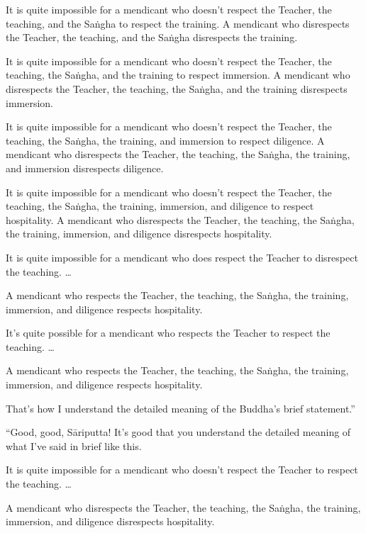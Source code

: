 \documentclass[12pt,openany]{book}%
\begin{document}
It is quite impossible for a mendicant who doesn’t respect the Teacher, the teaching, and the \textsanskrit{Saṅgha} to respect the training. A mendicant who disrespects the Teacher, the teaching, and the \textsanskrit{Saṅgha} disrespects the training. 

It is quite impossible for a mendicant who doesn’t respect the Teacher, the teaching, the \textsanskrit{Saṅgha}, and the training to respect immersion. A mendicant who disrespects the Teacher, the teaching, the \textsanskrit{Saṅgha}, and the training disrespects immersion. 

It is quite impossible for a mendicant who doesn’t respect the Teacher, the teaching, the \textsanskrit{Saṅgha}, the training, and immersion to respect diligence. A mendicant who disrespects the Teacher, the teaching, the \textsanskrit{Saṅgha}, the training, and immersion disrespects diligence. 

It is quite impossible for a mendicant who doesn’t respect the Teacher, the teaching, the \textsanskrit{Saṅgha}, the training, immersion, and diligence to respect hospitality. A mendicant who disrespects the Teacher, the teaching, the \textsanskrit{Saṅgha}, the training, immersion, and diligence disrespects hospitality. 

It is quite impossible for a mendicant who does respect the Teacher to disrespect the teaching. … 

A mendicant who respects the Teacher, the teaching, the \textsanskrit{Saṅgha}, the training, immersion, and diligence respects hospitality. 

It’s quite possible for a mendicant who respects the Teacher to respect the teaching. … 

A mendicant who respects the Teacher, the teaching, the \textsanskrit{Saṅgha}, the training, immersion, and diligence respects hospitality. 

That’s how I understand the detailed meaning of the Buddha’s brief statement.” 

“Good, good, \textsanskrit{Sāriputta}! It’s good that you understand the detailed meaning of what I’ve said in brief like this. 

It is quite impossible for a mendicant who doesn’t respect the Teacher to respect the teaching. … 

A mendicant who disrespects the Teacher, the teaching, the \textsanskrit{Saṅgha}, the training, immersion, and diligence disrespects hospitality. 
\end{document}
